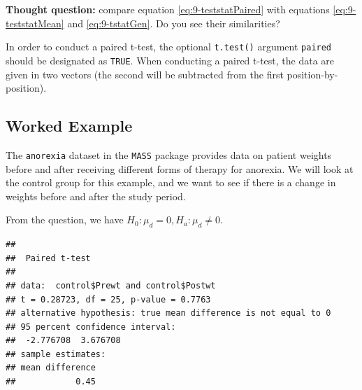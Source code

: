 \documentclass[
]{book}
\newenvironment{Shaded}{\begin{snugshade}}{\end{snugshade}}
\newcommand{\AttributeTok}[1]{\textcolor[rgb]{0.13,0.29,0.53}{#1}}
\newcommand{\ConstantTok}[1]{\textcolor[rgb]{0.56,0.35,0.01}{#1}}
\newcommand{\DecValTok}[1]{\textcolor[rgb]{0.00,0.00,0.81}{#1}}
\newcommand{\DocumentationTok}[1]{\textcolor[rgb]{0.56,0.35,0.01}{\textbf{\textit{#1}}}}
\newcommand{\FunctionTok}[1]{\textcolor[rgb]{0.13,0.29,0.53}{\textbf{#1}}}
\newcommand{\NormalTok}[1]{#1}
\newcommand{\OtherTok}[1]{\textcolor[rgb]{0.56,0.35,0.01}{#1}}
\newcommand{\SpecialCharTok}[1]{\textcolor[rgb]{0.81,0.36,0.00}{\textbf{#1}}}
\newcommand{\StringTok}[1]{\textcolor[rgb]{0.31,0.60,0.02}{#1}}
\theoremstyle{definition}
\theoremstyle{definition}
\theoremstyle{definition}
\theoremstyle{definition}
\theoremstyle{remark}
\begin{document}
\textbf{Thought question:} compare equation \eqref{eq:9-teststatPaired} with equations \eqref{eq:9-teststatMean} and \eqref{eq:9-tstatGen}. Do you see their similarities?

In order to conduct a paired t-test, the optional \texttt{t.test()} argument \texttt{paired} should be designated as \texttt{TRUE}. When conducting a paired t-test, the data are given in two vectors (the second will be subtracted from the first position-by-position).

\hypertarget{egpairedt}{%
\subsection{Worked Example}\label{egpairedt}}

The \texttt{anorexia} dataset in the \texttt{MASS} package provides data on patient weights before and after receiving different forms of therapy for anorexia. We will look at the control group for this example, and we want to see if there is a change in weights before and after the study period.

From the question, we have \(H_0: \mu_d = 0, H_a: \mu_d \neq 0\).

\begin{Shaded}
\end{Shaded}

\begin{verbatim}
## 
##  Paired t-test
## 
## data:  control$Prewt and control$Postwt
## t = 0.28723, df = 25, p-value = 0.7763
## alternative hypothesis: true mean difference is not equal to 0
## 95 percent confidence interval:
##  -2.776708  3.676708
## sample estimates:
## mean difference 
##            0.45
\end{verbatim}
\end{document}
